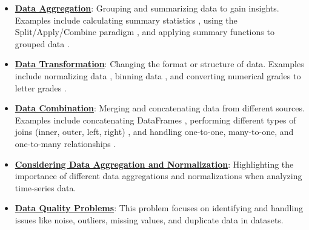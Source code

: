 \documentclass{article}%
\begin{document}
\begin{itemize}[leftmargin=*]
\item \href{https://purdue.brightspace.com/d2l/common/assets/pdfjs-d2l-dist/1.0.14-legacy/web/viewer.html?file=\%2Fcontent\%2Fenforced\%2F1095465-WL.202510.CS24200.LE1\%2F06L3-wrangling.pdf\%3Fou\%3D1095465\&lang=en-us\&container=d2l-fileviewer-rendered-pdf\&fullscreen=d2l-fileviewer-rendered-pdf-dialog\&height=667#page=8}{\textbf{Data Aggregation}}: Grouping and summarizing data to gain insights. Examples include calculating summary statistics , using the Split/Apply/Combine paradigm , and applying summary functions to grouped data .%
\item \href{https://purdue.brightspace.com/d2l/common/assets/pdfjs-d2l-dist/1.0.14-legacy/web/viewer.html?file=\%2Fcontent\%2Fenforced\%2F1095465-WL.202510.CS24200.LE1\%2F06L3-wrangling.pdf\%3Fou\%3D1095465\&lang=en-us\&container=d2l-fileviewer-rendered-pdf\&fullscreen=d2l-fileviewer-rendered-pdf-dialog\&height=667#page=47}{\textbf{Data Transformation}}: Changing the format or structure of data. Examples include normalizing data , binning data , and converting numerical grades to letter grades .%
\item \href{https://purdue.brightspace.com/d2l/common/assets/pdfjs-d2l-dist/1.0.14-legacy/web/viewer.html?file=\%2Fcontent\%2Fenforced\%2F1095465-WL.202510.CS24200.LE1\%2F06L3-wrangling.pdf\%3Fou\%3D1095465\&lang=en-us\&container=d2l-fileviewer-rendered-pdf\&fullscreen=d2l-fileviewer-rendered-pdf-dialog\&height=667#page=59}{\textbf{Data Combination}}: Merging and concatenating data from different sources. Examples include concatenating DataFrames , performing different types of joins (inner, outer, left, right) , and handling one-to-one, many-to-one, and one-to-many relationships .%
\item \href{https://purdue.brightspace.com/d2l/common/assets/pdfjs-d2l-dist/1.0.14-legacy/web/viewer.html?file=\%2Fcontent\%2Fenforced\%2F1095465-WL.202510.CS24200.LE1\%2F10L2-Vis.pdf\%3Fou\%3D1095465\&lang=en-us\&container=d2l-fileviewer-rendered-pdf\&fullscreen=d2l-fileviewer-rendered-pdf-dialog\&height=667#page=68}{\textbf{Considering Data Aggregation and Normalization}}: Highlighting the importance of different data aggregations and normalizations when analyzing time-series data.%
\item \href{https://purdue.brightspace.com/d2l/common/assets/pdfjs-d2l-dist/1.0.14-legacy/web/viewer.html?file=\%2Fcontent\%2Fenforced\%2F1095465-WL.202510.CS24200.LE1\%2F12-truth.pdf\%3Fou\%3D1095465\&lang=en-us\&container=d2l-fileviewer-rendered-pdf\&fullscreen=d2l-fileviewer-rendered-pdf-dialog\&height=667#page=3}{\textbf{Data Quality Problems}}: This problem focuses on identifying and handling issues like noise, outliers, missing values, and duplicate data in datasets.%
\end{itemize}
\end{document}
